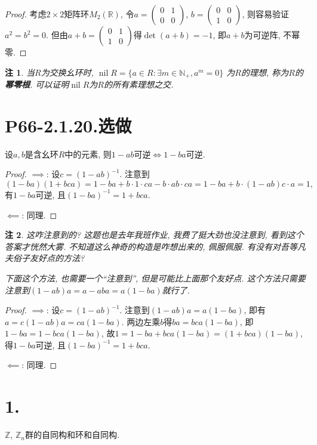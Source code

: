 \documentclass[12pt, a4paper, fontset=windows]{ctexart}
\newcommand{\N}{\mathbb{N}}
\newcommand{\R}{\mathbb{R}}
\newcommand{\Z}{\mathbb{Z}}
\newcommand{\nil}{\operatorname{nil}}
\newcommand{\xuan}{{\normalsize 选做}}
\newcommand{\yh}[1]{“{#1}”} %
\def\pmat#1{\begin{pmatrix}#1\end{pmatrix}}
\newtheorem*{remark}{注}
\begin{document}
\begin{proof}
考虑$2\times 2$矩阵环$M_2(\R)$, 令$a=\pmat{0&1\\0&0}$, $b=\pmat{0&0\\1&0}$, 
则容易验证$a^2=b^2=0$. 但由$a+b=\pmat{0&1\\1&0}$得$\det(a+b)=-1$, 
即$a+b$为可逆阵, 不幂零. 
\end{proof}

\begin{remark}
当$R$为交换幺环时, $\nil R=\{a\in R:\exists m\in\N_+,a^m=0\}$
为$R$的理想, 称为$R$的{\bf 幂零根}. 可以证明$\nil R$为$R$的所有素理想之交. 
\end{remark}

\section*{P66-2.1.20.\xuan}

设$a,b$是含幺环$R$中的元素, 则$1-ab$可逆$\iff 1-ba$可逆. 

\begin{proof}
$\implies$: 设$c=(1-ab)^{-1}$. 注意到
\[(1-ba)(1+bca)=1-ba+b\cdot 1\cdot ca-b\cdot ab\cdot ca=1-ba+b\cdot(1-ab)c\cdot a=1,\]
有$1-ba$可逆, 且$(1-ba)^{-1}=1+bca$. 

$\impliedby$: 同理. 
\end{proof}

\begin{remark}
这咋注意到的? 这题也是去年我班作业, 我费了挺大劲也没注意到, 
看到这个答案才恍然大雾. 不知道这么神奇的构造是咋想出来的, 佩服佩服. 
有没有对吾等凡夫俗子友好点的方法? 

下面这个方法, 也需要一个\yh{注意到}, 但是可能比上面那个友好点. 
这个方法只需要注意到$(1-ab)a=a-aba=a(1-ba)$就行了. 
\end{remark}

\begin{proof}
$\implies$: 设$c=(1-ab)^{-1}$. 注意到$(1-ab)a=a(1-ba)$, 
即有$a=c(1-ab)a=ca(1-ba)$. 两边左乘$b$得$ba=bca(1-ba)$, 
即$1-ba=1-bca(1-ba)$, 故$1=1-ba+bca(1-ba)=(1+bca)(1-ba)$, 
得$1-ba$可逆, 且$(1-ba)^{-1}=1+bca$. 

$\impliedby$: 同理. 
\end{proof}

\section*{1.}
\label{auts}

$\Z$, $\Z_n$群的自同构和环和自同构. 
\end{document}
